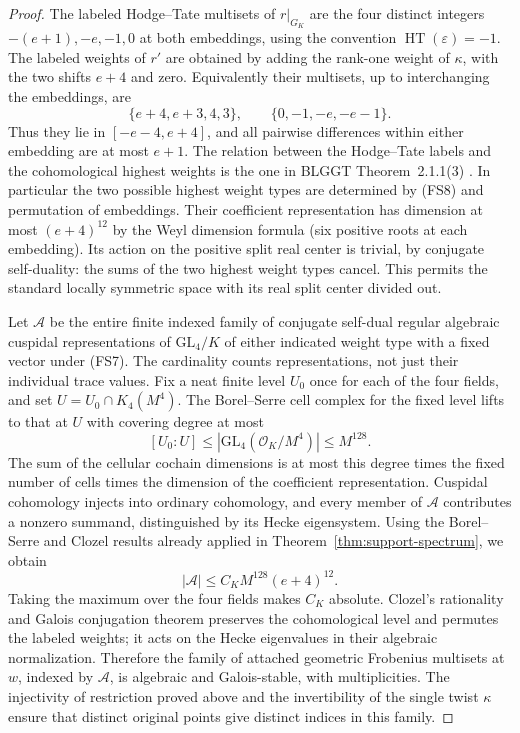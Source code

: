 \begin{proof}
The labeled Hodge--Tate multisets of \(r|_{G_K}\) are the
four distinct integers \(-(e+1),-e,-1,0\) at both embeddings,
using the convention \(\operatorname{HT}(\varepsilon)=-1\).
The labeled weights of \(r'\) are obtained by adding the
rank-one weight of \(\kappa\), with the two shifts \(e+4\)
and zero. Equivalently their multisets, up to interchanging
the embeddings, are
\[
           \{e+4,e+3,4,3\},\qquad \{0,-1,-e,-e-1\}.
                                                               \tag{FS8}
\]
Thus they lie in \([-e-4,e+4]\), and all pairwise
differences within either embedding are at most \(e+1\).
The relation between the Hodge--Tate labels and the
cohomological highest weights is the one in
BLGGT Theorem~2.1.1(3) \cite{support-spectrum-BLGGT}.
In particular the two possible highest weight types
are determined by (FS8) and permutation of embeddings.
Their coefficient representation has dimension at
most \((e+4)^{12}\) by the Weyl dimension formula
(six positive roots at each embedding). Its action on
the positive split real center is trivial, by conjugate
self-duality: the sums of the two highest weight types
cancel. This permits the standard locally symmetric
space with its real split center divided out.

Let \(\mathcal A\) be the entire finite indexed family of
conjugate self-dual regular algebraic cuspidal representations
of \(\mathrm{GL}_4/K\) of either indicated weight type with
a fixed vector under (FS7). The cardinality counts
representations, not just their individual trace values.
Fix a neat finite level \(U_0\) once for each of the four
fields, and set \(U=U_0\cap K_4(M^4)\).
The Borel--Serre cell complex for the fixed level lifts
to that at \(U\) with covering degree at most
\[
        [U_0:U]\le |\mathrm{GL}_4(\mathcal O_K/M^4)|
                                      \le M^{128}.
\]
The sum of the cellular cochain dimensions is at most
this degree times the fixed number of cells times the
dimension of the coefficient representation.
Cuspidal cohomology injects into ordinary cohomology,
and every member of \(\mathcal A\) contributes a nonzero
summand, distinguished by its Hecke eigensystem.
Using the Borel--Serre and Clozel results already applied
in Theorem~\ref{thm:support-spectrum}, we obtain
\[
                     |\mathcal A|\le C_K M^{128}(e+4)^{12}.
                                                               \tag{FS9}
\]
Taking the maximum over the four fields makes \(C_K\)
absolute. Clozel's rationality and Galois conjugation
theorem preserves the cohomological level and permutes
the labeled weights; it acts on the Hecke eigenvalues
in their algebraic normalization. Therefore the family
of attached geometric Frobenius multisets at \(w\),
indexed by \(\mathcal A\), is algebraic and
Galois-stable, with multiplicities. The injectivity of
restriction proved above and the invertibility of
the single twist \(\kappa\) ensure that distinct original
points give distinct indices in this family.


\end{proof}
